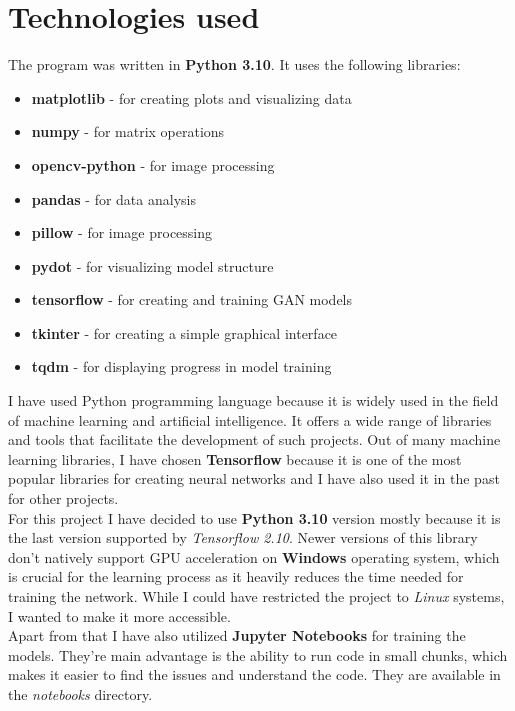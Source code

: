\documentclass{article}
\begin{document}
\section{Technologies used}
The program was written in \textbf{Python 3.10}. It uses the following libraries:
\begin{itemize}
    \setlength\itemsep{0pt}
    \item \textbf{matplotlib} - for creating plots and visualizing data
    \item \textbf{numpy} - for matrix operations
    \item \textbf{opencv-python} - for image processing
    \item \textbf{pandas} - for data analysis
    \item \textbf{pillow} - for image processing
    \item \textbf{pydot} - for visualizing model structure
    \item \textbf{tensorflow} - for creating and training GAN models
    \item \textbf{tkinter} - for creating a simple graphical interface
    \item \textbf{tqdm} - for displaying progress in model training
\end{itemize}
I have used Python programming language because it is widely used in the field of machine learning and artificial intelligence. It offers a wide range of libraries and tools that facilitate the development of such projects. Out of many machine learning libraries, I have chosen \textbf{Tensorflow} because it is one of the most popular libraries for creating neural networks and I have also used it in the past for other projects.
\vspace{3mm} \\
For this project I have decided to use \textbf{Python 3.10} version mostly because it is the last version supported by \textit{Tensorflow 2.10}. Newer versions of this library don't natively support GPU acceleration on \textbf{Windows} operating system, which is crucial for the learning process as it heavily reduces the time needed for training the network. While I could have restricted the project to \textit{Linux} systems, I wanted to make it more accessible.
\vspace{3mm} \\
Apart from that I have also utilized \textbf{Jupyter Notebooks} for training the models. They're main advantage is the ability to run code in small chunks, which makes it easier to find the issues and understand the code. They are available in the \textit{notebooks} directory.
\end{document}
